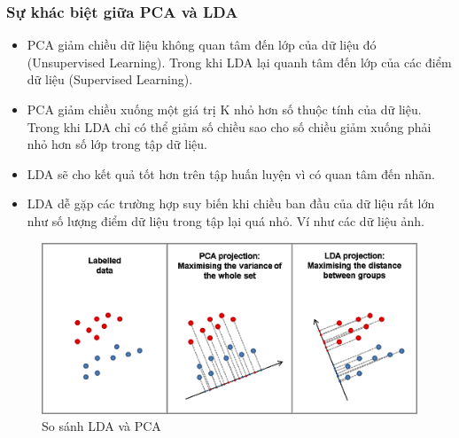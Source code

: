 \subsubsection{Sự khác biệt giữa PCA và LDA}
\begin{itemize}
	\item PCA giảm chiều dữ liệu không quan tâm đến lớp của dữ liệu đó (Unsupervised Learning). Trong khi LDA lại quanh tâm đến lớp của các điểm dữ liệu (Supervised Learning).
	\item PCA giảm chiều xuống một giá trị K nhỏ hơn số thuộc tính của dữ liệu. Trong khi LDA chỉ có thể  giảm số chiều sao cho số chiều giảm xuống phải nhỏ hơn số lớp trong tập dữ liệu.
	\item LDA sẽ cho kết quả tốt hơn trên tập huấn luyện vì có quan tâm đến nhãn.
	\item LDA dễ gặp các trường hợp suy biến khi chiều ban đầu của dữ liệu rất lớn như số lượng điểm dữ liệu trong tập lại quá nhỏ. Ví như các dữ liệu ảnh.
\end{itemize}
\begin{figure}[H]
	\begin{center}
		\includegraphics[scale = 0.5]{images/theo2/LDA-PCA-cmp}
		\caption{So sánh LDA và PCA}
	\end{center}
\end{figure}